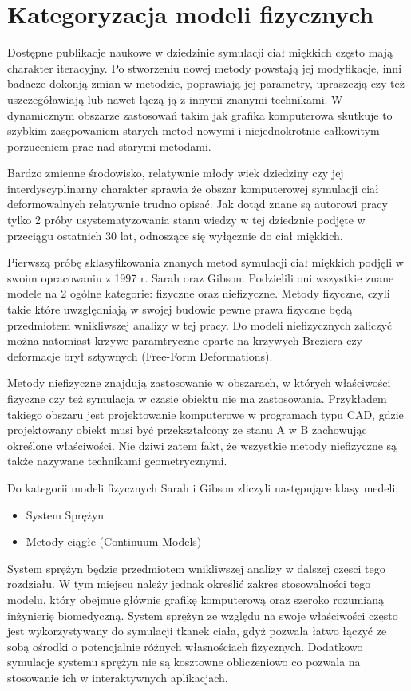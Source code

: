 \section{Kategoryzacja modeli fizycznych}

Dostępne publikacje naukowe w dziedzinie symulacji ciał miękkich często mają charakter
iteracyjny. Po stworzeniu nowej metody powstają jej modyfikacje, inni badacze
dokonją zmian w metodzie, poprawiają jej parametry, upraszczją czy też
uszczegóławiają lub nawet łączą ją z innymi znanymi technikami. W 
dynamicznym obszarze zastosowań takim jak grafika komputerowa skutkuje to
szybkim zasępowaniem starych metod nowymi i niejednokrotnie całkowitym
porzuceniem prac nad starymi metodami. 

Bardzo zmienne środowisko, relatywnie młody wiek dziedziny czy jej 
interdyscyplinarny charakter sprawia
że obszar komputerowej symulacji ciał deformowalnych relatywnie trudno opisać.
Jak dotąd znane są autorowi pracy tylko 2 próby usystematyzowania stanu wiedzy w
tej dziedznie podjęte w przeciągu ostatnich 30 lat, odnoszące się wyłącznie do
ciał miękkich.

Pierwszą próbę sklasyfikowania znanych metod symulacji ciał miękkich
podjęli w swoim opracowaniu z 1997 r. Sarah oraz Gibson\cite{TR97-19}. Podzielili
oni wszystkie znane modele na 2 ogólne kategorie: fizyczne oraz niefizyczne. Metody fizyczne, czyli
takie które uwzględniają w swojej budowie pewne prawa fizyczne będą przedmiotem
wnikliwszej analizy w tej pracy. Do modeli niefizycznych zaliczyć można natomiast
krzywe paramtryczne oparte na krzywych Breziera czy deformacje brył sztywnych (Free-Form Deformations).\cite{pbdo}

Metody niefizyczne znajdują zastosowanie w obszarach, w których właściwości
fizyczne czy też symulacja w czasie obiektu nie ma zastosowania. Przykładem
takiego obszaru jest projektowanie komputerowe w programach typu CAD, gdzie
projektowany obiekt musi być przekształcony ze stanu A w B zachowując określone
właściwości. Nie dziwi zatem fakt, że wszystkie metody niefizyczne są także 
nazywane technikami geometrycznymi.

Do kategorii modeli fizycznych Sarah i Gibson zliczyli następujące klasy medeli:
\begin{itemize}
\item System Sprężyn
\item Metody ciągłe (Continuum Models)
\end{itemize}

System sprężyn będzie przedmiotem wnikliwszej analizy w dalszej częsci tego
rozdziału. W tym miejscu należy jednak określić zakres stosowalności tego
modelu, który obejmue głównie grafikę komputerową oraz szeroko rozumianą
inżynierię biomedyczną. System sprężyn ze względu na swoje właściwości 
często jest wykorzystywany do symulacji tkanek ciała, gdyż pozwala łatwo łączyć ze
sobą ośrodki o potencjalnie różnych własnościach fizycznych. Dodatkowo symulacje
systemu sprężyn nie są kosztowne obliczeniowo co pozwala na stosowanie ich w
interaktywnych aplikacjach.

